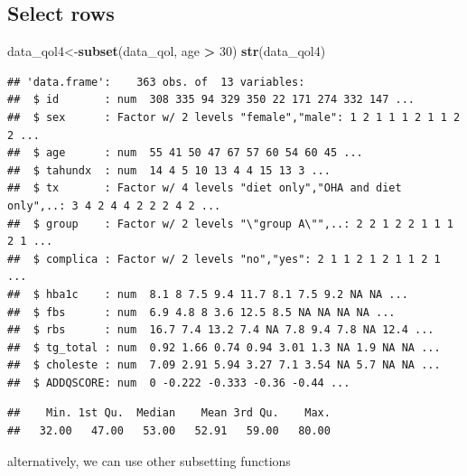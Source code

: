 \documentclass[]{book}
\newenvironment{Shaded}{\begin{snugshade}}{\end{snugshade}}
\newcommand{\KeywordTok}[1]{\textcolor[rgb]{0.13,0.29,0.53}{\textbf{#1}}}
\newcommand{\DecValTok}[1]{\textcolor[rgb]{0.00,0.00,0.81}{#1}}
\newcommand{\StringTok}[1]{\textcolor[rgb]{0.31,0.60,0.02}{#1}}
\newcommand{\OperatorTok}[1]{\textcolor[rgb]{0.81,0.36,0.00}{\textbf{#1}}}
\newcommand{\NormalTok}[1]{#1}
\theoremstyle{definition}
\theoremstyle{definition}
\theoremstyle{remark}
\begin{document}
\subsection{Select rows}\label{select-rows}

\begin{Shaded}
\begin{Highlighting}[]
\NormalTok{data_qol4<-}\KeywordTok{subset}\NormalTok{(data_qol, age }\OperatorTok{>}\StringTok{ }\DecValTok{30}\NormalTok{)}
\KeywordTok{str}\NormalTok{(data_qol4)}
\end{Highlighting}
\end{Shaded}

\begin{verbatim}
## 'data.frame':    363 obs. of  13 variables:
##  $ id       : num  308 335 94 329 350 22 171 274 332 147 ...
##  $ sex      : Factor w/ 2 levels "female","male": 1 2 1 1 1 2 1 1 2 2 ...
##  $ age      : num  55 41 50 47 67 57 60 54 60 45 ...
##  $ tahundx  : num  14 4 5 10 13 4 4 15 13 3 ...
##  $ tx       : Factor w/ 4 levels "diet only","OHA and diet only",..: 3 4 2 4 4 2 2 2 4 2 ...
##  $ group    : Factor w/ 2 levels "\"group A\"",..: 2 2 1 2 2 1 1 1 2 1 ...
##  $ complica : Factor w/ 2 levels "no","yes": 2 1 1 2 1 2 1 1 2 1 ...
##  $ hba1c    : num  8.1 8 7.5 9.4 11.7 8.1 7.5 9.2 NA NA ...
##  $ fbs      : num  6.9 4.8 8 3.6 12.5 8.5 NA NA NA NA ...
##  $ rbs      : num  16.7 7.4 13.2 7.4 NA 7.8 9.4 7.8 NA 12.4 ...
##  $ tg_total : num  0.92 1.66 0.74 0.94 3.01 1.3 NA 1.9 NA NA ...
##  $ choleste : num  7.09 2.91 5.94 3.27 7.1 3.54 NA 5.7 NA NA ...
##  $ ADDQSCORE: num  0 -0.222 -0.333 -0.36 -0.44 ...
\end{verbatim}

\begin{Shaded}
\end{Shaded}

\begin{verbatim}
##    Min. 1st Qu.  Median    Mean 3rd Qu.    Max. 
##   32.00   47.00   53.00   52.91   59.00   80.00
\end{verbatim}

alternatively, we can use other subsetting functions

\begin{Shaded}
\end{Shaded}
\end{document}
